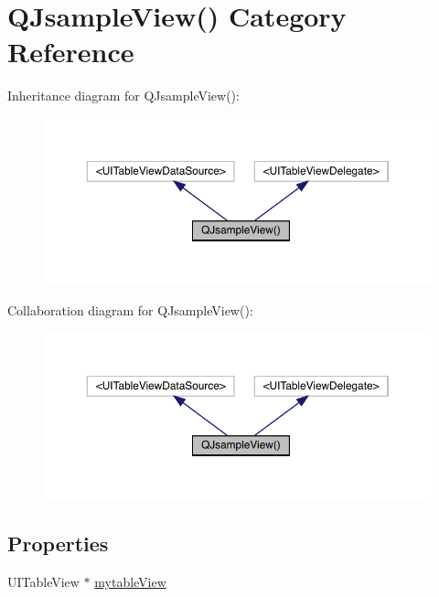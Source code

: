 \hypertarget{category_q_jsample_view_07_08}{}\section{Q\+Jsample\+View() Category Reference}
\label{category_q_jsample_view_07_08}


Inheritance diagram for Q\+Jsample\+View()\+:\nopagebreak
\begin{figure}[H]
\begin{center}
\leavevmode
\includegraphics[width=350pt]{category_q_jsample_view_07_08__inherit__graph}
\end{center}
\end{figure}


Collaboration diagram for Q\+Jsample\+View()\+:\nopagebreak
\begin{figure}[H]
\begin{center}
\leavevmode
\includegraphics[width=350pt]{category_q_jsample_view_07_08__coll__graph}
\end{center}
\end{figure}
\subsection*{Properties}
\begin{DoxyCompactItemize}
\item 
U\+I\+Table\+View $\ast$ \mbox{\hyperlink{category_q_jsample_view_07_08_a226b1d79ff35b1dc2bc1c9e64f252584}{mytable\+View}}
\end{DoxyCompactItemize}


